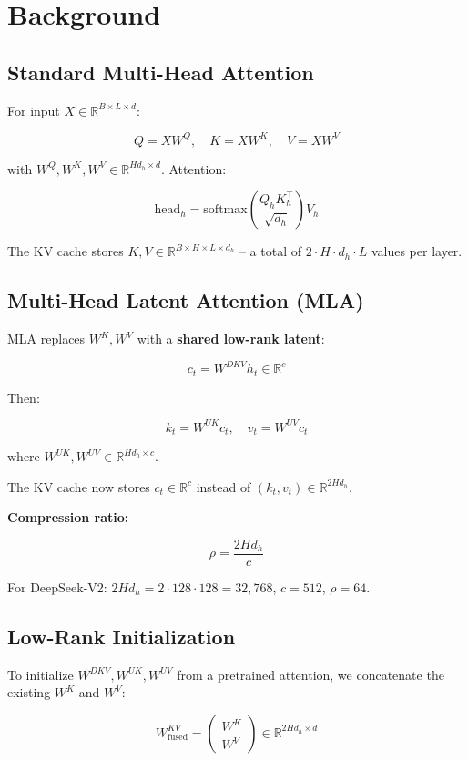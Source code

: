
\section{Background}

\subsection{Standard Multi-Head Attention}

For input $X \in \mathbb{R}^{B \times L \times d}$:

\[
Q = X W^Q, \quad K = X W^K, \quad V = X W^V
\tag{3.1}
\]

with $W^Q, W^K, W^V \in \mathbb{R}^{H d_h \times d}$. Attention:

\[
\text{head}_h = \text{softmax}\!\left(\frac{Q_h K_h^\top}{\sqrt{d_h}}\right) V_h
\tag{3.2}
\]

The KV cache stores $K, V \in \mathbb{R}^{B \times H \times L \times d_h}$ -- 
a total of $2 \cdot H \cdot d_h \cdot L$ values per layer.

\subsection{Multi-Head Latent Attention (MLA)}

MLA replaces $W^K, W^V$ with a \textbf{shared low-rank latent}:

\[
c_t = W^{DKV} h_t \in \mathbb{R}^c
\tag{3.3}
\]

Then:

\[
k_t = W^{UK} c_t, \quad v_t = W^{UV} c_t
\tag{3.4}
\]

where $W^{UK}, W^{UV} \in \mathbb{R}^{H d_h \times c}$.

The KV cache now stores $c_t \in \mathbb{R}^c$ instead of $(k_t, v_t) \in \mathbb{R}^{2 H d_h}$.

\textbf{Compression ratio:}

\[
\rho = \frac{2 H d_h}{c}
\tag{3.5}
\]

For DeepSeek-V2: $2 H d_h = 2 \cdot 128 \cdot 128 = 32{,}768$, $c = 512$, 
$\rho = 64$.

\subsection{Low-Rank Initialization}

To initialize $W^{DKV}, W^{UK}, W^{UV}$ from a pretrained attention, we 
concatenate the existing $W^K$ and $W^V$:

\[
W^{KV}_\text{fused} = \begin{pmatrix} W^K \\ W^V \end{pmatrix} \in \mathbb{R}^{2 H d_h \times d}
\tag{3.6}
\]

